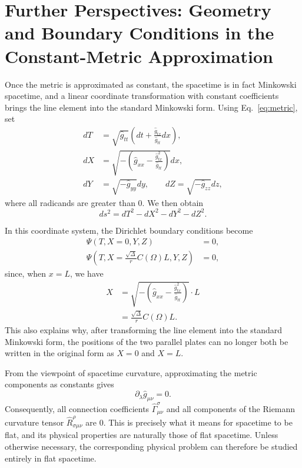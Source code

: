 \section{Further Perspectives: Geometry and Boundary Conditions in the Constant-Metric Approximation}
\label{sec:geometry}

Once the metric is approximated as constant, the spacetime is in fact Minkowski spacetime, and a linear coordinate transformation with constant coefficients brings the line element into the standard Minkowski form. Using Eq.~\eqref{eq:metric}, set 
\begin{equation}
\label{eq:coordinates}
\begin{aligned}
dT &=\sqrt{\hat{g}_{tt}}\left(dt+\frac{\hat{g}_{tx}}{\hat{g}_{tt}}dx\right),\\
dX &=\sqrt{-\left(\hat{g}_{xx}-\frac{\hat{g}^{2}_{tx}}{\hat{g}_{tt}}\right)}dx,\\
dY &=\sqrt{-\hat{g}_{yy}}dy,\qquad dZ=\sqrt{-\hat{g}_{zz}}dz,
\end{aligned}
\end{equation}
 where all radicands are greater than $0$. We then obtain 
\begin{equation}
\label{eq:minkowski}
ds^{2}=dT^{2}-dX^{2}-dY^{2}-dZ^{2}.
\end{equation}


In this coordinate system, the Dirichlet boundary conditions become 
\begin{equation}
\label{eq:boundary}
\begin{aligned}
\Psi\left(T,X=0,Y,Z\right)&=0,\\
\Psi\left(T,X=\frac{\sqrt{\Delta}}{r}C\left(\Omega\right)L,Y,Z\right)&=0,
\end{aligned}
\end{equation}
 since, when $x=L$, we have 
\begin{equation}
\label{eq:transformed-plate}
\begin{aligned}
X & =\sqrt{-\left(\hat{g}_{xx}-\frac{\hat{g}^{2}_{tx}}{\hat{g}_{tt}}\right)}\cdot L\\
 & =\frac{\sqrt{\Delta}}{r}C\left(\Omega\right)L.
\end{aligned}
\end{equation}
 This also explains why, after transforming the line element into the standard Minkowski form, the positions of the two parallel plates can no longer both be written in the original form as $X=0$ and $X=L$.

From the viewpoint of spacetime curvature, approximating the metric components as constants gives 
\begin{equation}
\label{eq:constant-metric}
\partial_{\lambda}\hat{g}_{\mu\nu}=0.
\end{equation}
 Consequently, all connection coefficients $\hat{\Gamma}^{\sigma}_{\!\mu\nu}$ and all components of the Riemann curvature tensor $\hat{R}^{\rho}_{\!\sigma\mu\nu}$ are $0$. This is precisely what it means for spacetime to be flat, and its physical properties are naturally those of flat spacetime. Unless otherwise necessary, the corresponding physical problem can therefore be studied entirely in flat spacetime.

